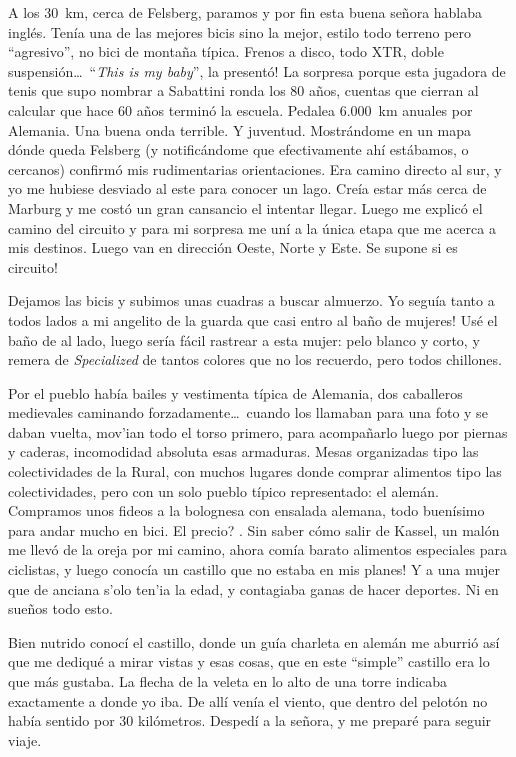 A los 30~km, cerca de Felsberg, paramos y por fin esta buena se\~nora hablaba
ingl\'es. Ten\'ia una de las mejores bicis sino la mejor, estilo todo terreno
pero ``agresivo'', no bici de monta\~na t\'ipica. Frenos a disco, todo {\small
XTR}, doble suspensi\'on\ldots\ \textexclamdown ``\emph{This is my baby}'', la
present\'o! La sorpresa porque esta jugadora de tenis que supo nombrar a
Sabattini ronda los 80 a\~nos, cuentas que cierran al calcular que hace 60
a\~nos termin\'o la escuela. Pedalea 6.000~km anuales por Alemania.
Una buena onda terrible. Y juventud. Mostr\'andome en un mapa d\'onde queda
Felsberg (y notific\'andome que efectivamente ah\'i est\'abamos, o cercanos)
confirm\'o mis rudimentarias orientaciones. Era camino directo al sur, y yo me
hubiese desviado al este para conocer un lago. Cre\'ia estar m\'as cerca de
Marburg y me cost\'o un gran cansancio el intentar llegar. Luego me explic\'o
el camino del circuito y para mi sorpresa me un\'i a la \'unica etapa que me
acerca a mis destinos. Luego van en direcci\'on Oeste, Norte y Este.
\textexclamdown Se supone si es circuito!

Dejamos las bicis y subimos unas cuadras a buscar almuerzo. \textexclamdown Yo
segu\'ia tanto a todos lados a mi angelito de la guarda que casi entro al
ba\~no de mujeres! Us\'e el ba\~no de al lado, luego ser\'ia f\'acil
rastrear a esta mujer: pelo blanco y corto, y remera de \emph{Specialized} de
tantos colores que no los recuerdo, pero todos chillones.

Por el pueblo hab\'ia bailes y vestimenta t\'ipica de Alemania, dos caballeros
medievales caminando forzadamente\ldots\ \textexclamdown cuando los llamaban
para una foto y se daban vuelta, mov'ian todo el torso primero, para
acompa\~narlo luego por piernas y caderas, incomodidad absoluta esas armaduras.
Mesas organizadas tipo las colectividades de la Rural, con muchos lugares donde
comprar alimentos tipo las colectividades, pero con un solo pueblo t\'ipico
representado: el alem\'an. Compramos unos fideos a la bolognesa con ensalada
alemana, todo buen\'isimo para andar mucho en bici. \textquestiondown El precio?
. \textexclamdown Sin saber c\'omo salir de Kassel, un
mal\'on me llev\'o de la oreja por mi camino, ahora com\'ia barato alimentos
especiales para ciclistas, y luego conoc\'ia un castillo que no estaba en mis
planes! Y a una mujer que de anciana s'olo ten'ia la edad, y contagiaba ganas de
hacer deportes. Ni en sue\~nos todo esto.

Bien nutrido conoc\'i el castillo, donde un gu\'ia charleta en alem\'an
me aburri\'o as\'i que me dediqu\'e a mirar vistas y esas cosas, que en este
``simple'' castillo era lo que m\'as gustaba. La flecha de la veleta en lo
alto de una torre indicaba exactamente a donde yo iba. De all\'i ven\'ia
el viento, que dentro del pelot\'on no hab\'ia sentido por 30 kil\'ometros.
Desped\'i a la se\~nora, y me prepar\'e para seguir viaje.

